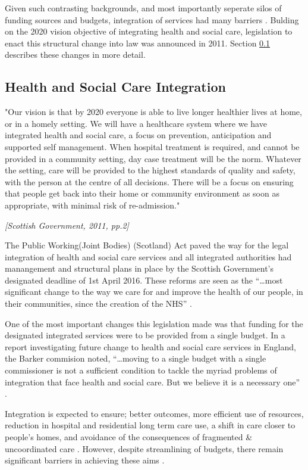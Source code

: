 \documentclass[12pt,]{report}
\begin{document}
Given such contrasting backgrounds, and most importantly seperate silos
of funding sources and budgets, integration of services had many
barriers \citep{RN456}. Bulding on the 2020 vision \citep{RN457}
objective of integrating health and social care, legislation to enact
this structural change into law was announced in 2011. Section
\ref{subsec:hsc-integration} describes these changes in more detail.

\subsection{Health and Social Care Integration}\label{subsec:hsc-integration}

\setlength{\epigraphwidth}{0.8\textwidth}
\epigraph{"Our vision is that by 2020 everyone is able to live longer healthier lives at home, or in a homely setting. We will have a healthcare system where we have integrated health and social care, a focus on prevention, anticipation and supported self management. When hospital treatment is required, and cannot be provided in a community setting, day case treatment will be the norm. Whatever the setting, care will be provided to the highest standards of quality and safety, with the person at the centre of all decisions. There will be a focus on ensuring that people get back into their home or community environment as soon as appropriate, with minimal risk of re-admission."}{\textit{[Scottish Government, 2011, pp.2]}}

The Public Working(Joint Bodies) (Scotland) Act \citep{RN459} paved the
way for the legal integration of health and social care services and all
integrated authorities had manangement and structural plans in place by
the Scottish Government's designated deadline of 1st April 2016. These
reforms are seen as the ``\ldots{}most significant change to the way we
care for and improve the health of our people, in their communities,
since the creation of the NHS'' \citep{RN461}.

One of the most important changes this legislation made was that funding
for the designated integrated services were to be provided from a single
budget. In a report investigating future change to health and social
care services in England, the Barker commision noted, ``\ldots{}moving
to a single budget with a single commissioner is not a sufficient
condition to tackle the myriad problems of integration that face health
and social care. But we believe it is a necessary one''
\citep[pp.9]{RN460}.

Integration is expected to ensure; better outcomes, more efficient use
of resources, reduction in hospital and residential long term care use,
a shift in care closer to people's homes, and avoidance of the
consequences of fragmented \& uncoordinated care
\citep{RN252, RN251, RN234, RN232, RN455, RN266}. However, despite
streamlining of budgets, there remain significant barriers in achieving
these aims \citep{RN252, RN251}.
\end{document}
